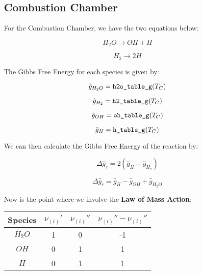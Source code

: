 \documentclass[12pt, Times New Roman]{article}
\begin{document}
    \vspace*{6pt}

    \subsection{Combustion Chamber}
    For the Combustion Chamber, we have the two equations below:

    \begin{equation}
        H_{2}O \rightarrow OH + H 
    \end{equation}

    \begin{equation}
        H_{2} \rightarrow 2H
    \end{equation}

    The Gibbs Free Energy for each species is given by:
    
    \begin{equation}
        \hat{g}_{H_{2}O} = \verb|h2o_table_g|(T_{C})
    \end{equation}

    \begin{equation}
        \hat{g}_{H_{2}} = \verb|h2_table_g|(T_{C})
    \end{equation}

    \begin{equation}
        \hat{g}_{OH} = \verb|oh_table_g|(T_{C})
    \end{equation}

    \begin{equation}
        \hat{g}_{H} = \verb|h_table_g|(T_{C})
    \end{equation}

    \vspace*{6pt}

    We can then calculate the Gibbs Free Energy of the reaction by:

    \begin{equation}
        \Delta \hat{g}_{r} = 2(\hat{g}_{H} - \hat{g}_{H_{2}}) 
    \end{equation}

    \begin{equation}
        \Delta \hat{g}_{r} = \hat{g}_{H} - \hat{g}_{OH} + \hat{g}_{H_{2}O}
    \end{equation}

    Now is the point where we involve the \textbf{Law of Mass Action}:

    \begin{center}
        \begin{tabular}{|c|c|c|c|}
            \hline
            Species & $\nu_{(i)} '$ & $\nu_{(i)} ''$ & $\nu_{(i)} '' - \nu_{(i)} ''$ \\
            \hline
            $H_{2}O$ & 1 & 0 & -1 \\
            \hline
            $OH$ & 0 & 1 & 1 \\
            \hline
            $H$ & 0 & 1 & 1 \\
            \hline
        \end{tabular}
    \end{center}
\end{document}
